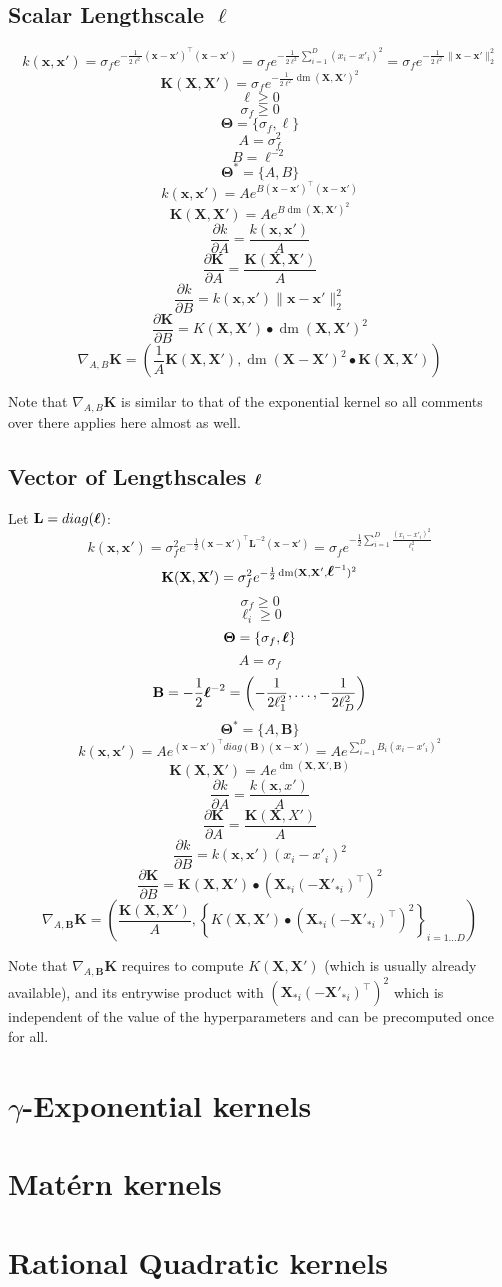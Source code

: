 \documentclass[a4paper,11pt]{article}
\newcommand\x{{\mathbf x}}
\newcommand\X{{\mathbf X}}
\newcommand\K{{\mathbf K}}
\newcommand\LL{{\mathbf L}}
\newcommand\ELL{{\Ivec \ell}}
\DeclareMathOperator*{\dm}{dm}
\newcommand{\Ivec}[1]{\mbox{\boldmath $#1$}}
\begin{document}
\subsection{Scalar Lengthscale $\ell$}
$$k(\x,\x') = \sigma_f e^{-\frac{1}{2\ell^2} (\x-\x')^{\top}(\x-\x')}
  = \sigma_f e^{-\frac{1}{2\ell^2} \sum_{i=1}^D (x_i - x'_i)^2} =
  \sigma_f e^{-\frac{1}{2\ell^2} \|\x-\x'\|_2^2}$$ 
$$\K(\X,\X') = \sigma_f e^{-\frac{1}{2\ell^2} \dm(\X,\X')^2}$$
$$\ell \ge 0$$
$$\sigma_f \ge 0$$
$$\mathbf{\Theta} = \{ \sigma_f, \ell \}$$
$$A = \sigma_f^2$$
$$B = \ell^{-2}$$
$$\mathbf{\Theta}^* = \{ A, B\}$$
$$k(\x,\x') = A e^{B (\x-\x')^{\top}(\x-\x')}$$
$$\K(\X,\X') = A e^{B \dm(\X,\X')^2}$$
$$\frac{\partial k}{\partial A} = \frac{k(\x,\x')}{A}$$
$$\frac{\partial \K}{\partial A} = \frac{\K(\X,\X')}{A}$$
$$\frac{\partial k}{\partial B} = k(\x,\x') \|\x-\x'\|_2^2$$
$$\frac{\partial \K}{\partial B} = K(\X,\X') \bullet \dm(\X,\X')^2$$
$$\nabla_{A,B} \K = (\frac{1}{A} \K(\X,\X'), \dm(\X-\X')^2 \bullet
\K(\X,\X'))$$

Note that $\nabla_{A,B} \K$ is similar to that of the exponential
kernel so all comments over there applies here almost as well.


\subsection{Vector of Lengthscales $\ELL$}
Let $\mathbf{L} = diag(\ELL)$:
$$k(\x,\x') = \sigma_f^2 e^{-\frac{1}{2}(\x-\x')^{\top} \LL^{-2}
  (\x-\x')} = \sigma_f e^{-\frac{1}{2}\sum_{i=1}^D \frac{(x_i - x'_i)^2}{\ell_i^2}}$$
$$\K(\X,\X') = \sigma_f^2 e^{-\frac{1}{2} \dm(\X,\X',\ELL^{-1})^2}$$
$$\sigma_f \ge 0$$
$$\ell_i \ge 0$$
$$\mathbf{\Theta} = \{ \sigma_f, \ELL\}$$
$$A = \sigma_f$$
$$\mathbf{B} = -\frac{1}{2}\ELL^{-2} =
\left(-\frac{1}{2\ell_1^2},\ldots,-\frac{1}{2\ell_D^2} \right)$$
$$\mathbf{\Theta}^* = \{ A, \mathbf{B}\}$$
$$k(\x,\x') = A e^{(\x-\x')^{\top} diag(\mathbf{B}) (\x-\x')} = A
e^{\sum_{i=1}^D B_i (x_i - x'_i)^2}$$ 
$$\K(\X,\X') = A e^{\dm(\X,\X',\mathbf{B})}$$
$$\frac{\partial k}{\partial A} = \frac{k(\x,x')}{A}$$
$$\frac{\partial \K}{\partial A} = \frac{\K(\X,X')}{A}$$
$$\frac{\partial k}{\partial B} = k(\x,\x') (x_i -x'_i)^2$$
$$\frac{\partial \K}{\partial B} = \K(\X,\X') \bullet (\X_{*i}
(-\X'_{*i})^{\top})^2$$
$$\nabla_{A,\mathbf{B}} \K = \left(\frac{\K(\X,\X')}{A}, \left\{ K(\X,\X')
  \bullet (\X_{*i} (-\X'_{*i})^{\top})^2 \right\}_{i=1 \ldots D} \right)$$

Note that $\nabla_{A,\mathbf{B}} \K$ requires to compute $K(\X,\X')$
(which is usually already available), and its entrywise product with
$(\X_{*i} (-\X'_{*i})^{\top})^2$ which is independent of the value of
the hyperparameters and can be precomputed once for all. 

\section{$\gamma$-Exponential kernels}

\section{Mat\'ern kernels}

\section{Rational Quadratic kernels}
\end{document}
